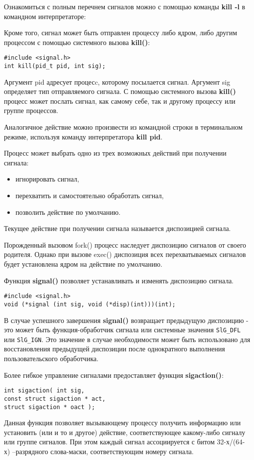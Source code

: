 \documentclass[a4paper]{article}
\begin{document}
	Ознакомиться с полным перечнем сигналов можно с помощью команды \textbf{kill -l} в командном интерпретаторе:
	

	Кроме того, сигнал может быть отправлен процессу либо ядром, либо другим процессом с помощью системного вызова \textbf{kill()}:
	\begin{lstlisting}[style=crs_cpp]
#include <signal.h>
int kill(pid_t pid, int sig);		
	\end{lstlisting}
	Аргумент pid адресует процесc, которому посылается сигнал. Аргумент sig определяет тип отправляемого сигнала. С помощью системного вызова \textbf{kill()} процесс может послать сигнал, как самому себе, так и другому процессу или группе процессов.
	
	Аналогичное действие можно произвести из командной строки в терминальном режиме, используя команду интерпретатора \textbf{kill pid}.
	
	Процесс может выбрать одно из трех возможных действий при получении сигнала:
	\begin{itemize}
	\item игнорировать сигнал,
	\item перехватить и самостоятельно обработать сигнал,
	\item позволить действие по умолчанию.	
	\end{itemize}
	
	Текущее действие при получении сигнала называется диспозицией сигнала.
	
	Порожденный вызовом fork() процесс наследует диспозицию сигналов от своего родителя. Однако при вызове exec() диспозиция всех перехватываемых сигналов будет установлена ядром на действие по умолчанию.
	
	Функция \textbf{signal()} позволяет устанавливать и изменять диспозицию сигнала.
	\begin{lstlisting}[style=crs_cpp]
#include <signal.h>
void (*signal (int sig, void (*disp)(int)))(int);	
	\end{lstlisting}
	
	В случае успешного завершения \textbf{signal()} возвращает предыдущую диспозицию - это может быть функция-обработчик сигнала или системные значения \texttt{SlG\_DFL} или \texttt{SlG\_IGN}. Это значение в случае необходимости может быть использовано для восстановления предыдущей диспозиции после однократного выполнения пользовательского обработчика.
	
	Более гибкое управление сигналами предоставляет функция \textbf{sigaction()}:
	\begin{lstlisting}[style=crs_cpp]
int sigaction( int sig,
const struct sigaction * act,
struct sigaction * oact );
	\end{lstlisting}
	Данная функция позволяет вызывающему процессу получить информацию или установить (или и то и другое) действие, соответствующее какому-либо сигналу или группе сигналов. При этом каждый сигнал ассоциируется с битом 32-х/(64-х) –разрядного слова-маски, соответствующим номеру сигнала.
	
\end{document}
